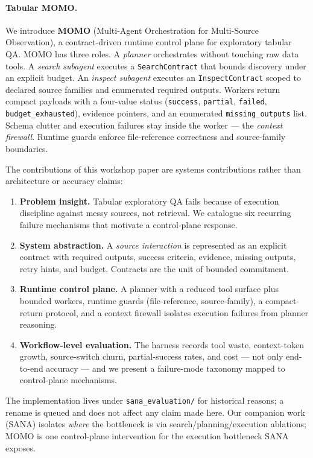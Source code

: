 \paragraph{Tabular MOMO.} We introduce \textbf{MOMO} (Multi-Agent Orchestration for Multi-Source Observation), a contract-driven runtime control plane for exploratory tabular QA. MOMO has three roles. A \emph{planner} orchestrates without touching raw data tools. A \emph{search subagent} executes a \texttt{SearchContract} that bounds discovery under an explicit budget. An \emph{inspect subagent} executes an \texttt{InspectContract} scoped to declared source families and enumerated required outputs. Workers return compact payloads with a four-value status (\texttt{success}, \texttt{partial}, \texttt{failed}, \texttt{budget\_exhausted}), evidence pointers, and an enumerated \texttt{missing\_outputs} list. Schema clutter and execution failures stay inside the worker --- the \emph{context firewall}. Runtime guards enforce file-reference correctness and source-family boundaries.

The contributions of this workshop paper are systems contributions rather than architecture or accuracy claims:
\begin{enumerate}
\item \textbf{Problem insight.} Tabular exploratory QA fails because of execution discipline against messy sources, not retrieval. We catalogue six recurring failure mechanisms that motivate a control-plane response.
\item \textbf{System abstraction.} A \emph{source interaction} is represented as an explicit contract with required outputs, success criteria, evidence, missing outputs, retry hints, and budget. Contracts are the unit of bounded commitment.
\item \textbf{Runtime control plane.} A planner with a reduced tool surface plus bounded workers, runtime guards (file-reference, source-family), a compact-return protocol, and a context firewall isolates execution failures from planner reasoning.
\item \textbf{Workflow-level evaluation.} The harness records tool waste, context-token growth, source-switch churn, partial-success rates, and cost --- not only end-to-end accuracy --- and we present a failure-mode taxonomy mapped to control-plane mechanisms.
\end{enumerate}

The implementation lives under \texttt{sana\_evaluation/} for historical reasons; a rename is queued and does not affect any claim made here. Our companion work (SANA) isolates \emph{where} the bottleneck is via search/planning/execution ablations; MOMO is one control-plane intervention for the execution bottleneck SANA exposes.
